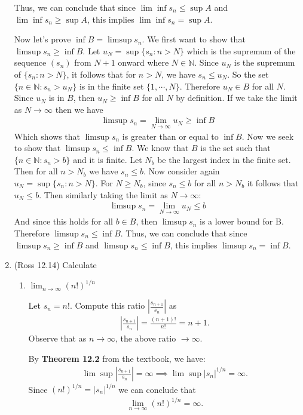 \documentclass [10pt]{article}
\newcommand{\jg}[1]{{\color{blue} #1}}
\begin{document}
\begin{enumerate}
{Thus, we can conclude that since $\lim \inf s_n \leq \sup A$ and $\lim \inf s_n \geq \sup A$, this implies $\lim \inf s_n = \sup A$. 

Now let's prove $\inf B = \limsup s_n$. We first want to show that $\limsup s_n \geq \inf B$. Let $u_N = \sup \{s_n : n > N \}$ which is the supremum of the sequence $(s_n)$ from $N + 1$ onward where $N \in \mathbb{N}$. Since $u_N$ is the supremum of $\{s_n : n > N \}$, it follows that for $n > N$, we have $s_n \leq u_N$. So the set $\{ n \in \mathbb{N} : s_n > u_N \}$ is in the finite set $\{ 1, \cdots, N \}$. Therefore $u_N \in B$ for all $N$. Since $u_N$ is in $B$, then $u_N \geq \inf B$ for all $N$ by definition. If we take the limit as $N \rightarrow \infty$ then we have 
\begin{align*}
    \limsup s_n = \lim_{N \rightarrow \infty} u_N \geq \inf B
\end{align*}
Which shows that $\limsup s_n$ is greater than or equal to $\inf B$. 
Now we seek to show that $\limsup s_n \leq \inf B$. We know that $B$ is the set such that $\{n \in \mathbb{N} : s_n > b \}$ and it is finite. Let $N_b$ be the largest index in the finite set. Then for all $n > N_b$ we have $s_n \leq b$. Now consider again $u_N = \sup \{s_n : n > N\}$. For $N \geq N_b$, since $s_n \leq b$ for all $n > N_b$ it follows that $u_N \leq b$. Then similarly taking the limit as $N \rightarrow \infty$: 
\begin{align*}
    \limsup s_n = \lim_{N \rightarrow \infty} u_N \leq b
\end{align*}
And since this holds for all $b \in B$, then $\limsup s_n$ is a lower bound for B. Therefore $\limsup s_n \leq \inf B$. 
Thus, we can conclude that since $\limsup s_n \geq \inf B$ and $\limsup s_n \leq \inf B$, this implies $\limsup s_n = \inf B$.

}

\clearpage
\item (Ross 12.14) Calculate
\begin{enumerate}
\item $\lim_{n \to \infty} (n!)^{1/n}$

\jg{
Let $s_n = n!$. Compute this ratio $\left| \frac{s_{n+1}}{s_n} \right|$ as 
\begin{align*}
    \left| \frac{s_{n+1}}{s_n} \right| = \frac{(n+1)!}{n!} = n+1.
\end{align*}
Observe that as $n \rightarrow \infty$, the above ratio $\rightarrow \infty$. 

By \textbf{Theorem 12.2} from the textbook, we have: 
\begin{align*}
    \lim \sup \left| \frac{s_{n+1}}{s_n} \right| = \infty \implies \lim \sup |s_n|^{1/n} = \infty.
\end{align*}
Since $(n!)^{1/n} = |s_n|^{1/n}$ we can conclude that 
\begin{align*}
    \lim_{n \rightarrow \infty} (n!)^{1/n} = \infty.
\end{align*}
}


\end{enumerate}
\end{enumerate}
\end{document}
